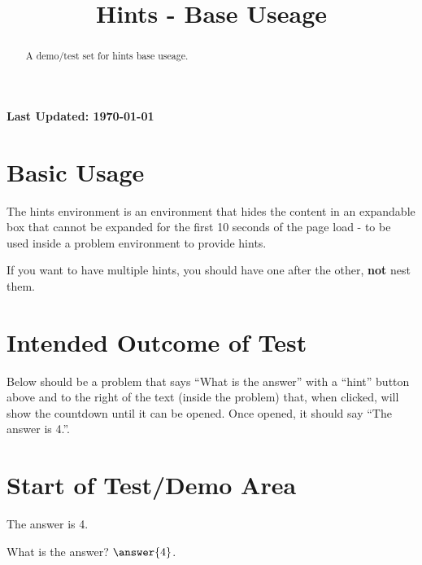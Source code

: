 \documentclass{ximera}
\title{Hints - Base Useage}
\begin{document}
\begin{abstract}
    A demo/test set for hints base useage.
\end{abstract}
\maketitle

{{\Huge \bfseries Last Updated: \today}} \\

\section{Basic Usage}
The hints environment is an environment that hides the content in an expandable box that cannot be expanded for
the first 10 seconds of the page load - to be used inside a problem environment to provide hints.

If you want to have multiple hints, you should have one after the other, \textbf{not} nest them.

\section{Intended Outcome of Test}

Below should be a problem that says ``What is the answer'' with a ``hint'' button above and to the right of the text (inside the problem)
that, when clicked, will show the countdown until it can be opened. Once opened, it should say ``The answer is 4.''.

\section{Start of Test/Demo Area}

\begin{problem}
    \begin{hint}
        The answer is 4.
    \end{hint}
    What is the answer? $\answer{4}$.
\end{problem}

\hrulefill
\end{document}
